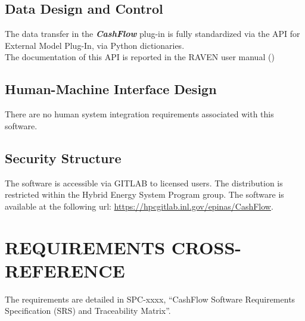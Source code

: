 \subsection{Data Design and Control}
The data transfer in the \textbf{\textit{CashFlow}}  plug-in is fully standardized via the API for External Model Plug-In, via
Python dictionaries.
\\The documentation of this  API is reported in the RAVEN user manual (\cite{RAVENuserManual})

\subsection{Human-Machine Interface Design} 
 There are no human system integration requirements associated with this software.

 \subsection{Security Structure} 


The software is accessible via GITLAB to licensed users. The distribution is restricted within the Hybrid Energy System Program group.
The software is available at the following url: \url{https://hpcgitlab.inl.gov/epinas/CashFlow}.

 \section{REQUIREMENTS CROSS-REFERENCE} 
The requirements are detailed in SPC-xxxx, ``CashFlow Software Requirements Specification (SRS) and Traceability Matrix''.